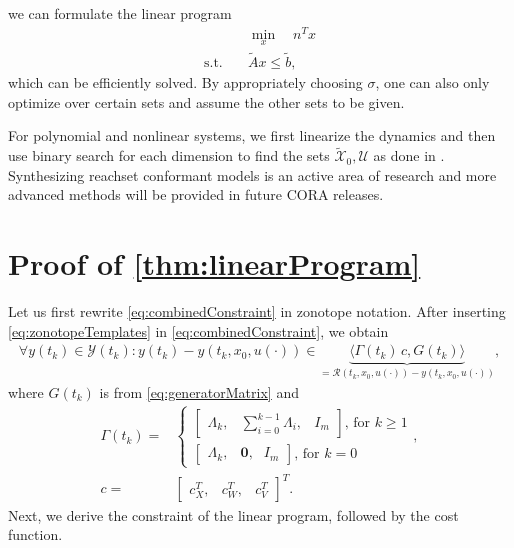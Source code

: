 \documentclass[EPiC]{easychair}
\renewcommand{\^}[1]{^{(#1)}}
\begin{document}
we can formulate the linear program 
\begin{equation*}
\begin{split}
 & \underset{x} \min \quad n^T x \\
 \text{s.t.} \quad & \tilde{A}x \leq \tilde{b},
\end{split}
\end{equation*}
which can be efficiently solved. By appropriately choosing $\sigma$, one can also only optimize over certain sets and assume the other sets to be given.

For polynomial and nonlinear systems, we first linearize the dynamics and then use binary search for each dimension to find the sets $\tilde{\mathcal{X}}_0,\mathcal{U}$ as done in \cite{Liu2018a}. Synthesizing reachset conformant models is an active area of research and more advanced methods will be provided in future CORA releases. 



\label{sec:bib}

%
%
%



\appendix
\section{Proof of \cref{thm:linearProgram}} \label{sec:derivationOfLinearProgram}

Let us first rewrite \eqref{eq:combinedConstraint} in zonotope notation. After inserting \eqref{eq:zonotopeTemplates} in \eqref{eq:combinedConstraint}, we obtain
 \begin{equation}
\label{eq:zonotopeEnclosure}
 \begin{split}
  \forall y(t_k) \in \mathcal{Y}(t_k): y(t_k) - y(t_k,x_0,u(\cdot)) \in \underbrace{\langle \Gamma(t_k) \, c, G(t_k)\rangle}_{=\mathcal{R}(t_k,x_0,u(\cdot)) - y(t_k,x_0,u(\cdot))},
 \end{split}
\end{equation}
where $G(t_k)$ is from \eqref{eq:generatorMatrix} and
\begin{equation*}
 \begin{split}
 \Gamma(t_k) =& \begin{cases}
                 \begin{bmatrix} \Lambda_k, & \sum_{i=0}^{k-1} \Lambda_i, & I_m \end{bmatrix} \text{, for } k\geq1 \\[0.2cm]
                 \begin{bmatrix} \Lambda_k, & \textbf{0}, & I_m \end{bmatrix}\text{, for } k=0
                \end{cases}
, \\
 c =& \begin{bmatrix} c_X^T, & c_W^T, & c_V^T \end{bmatrix}^T.
 \end{split}
\end{equation*}
Next, we derive the constraint of the linear program, followed by the cost function.
\end{document}
